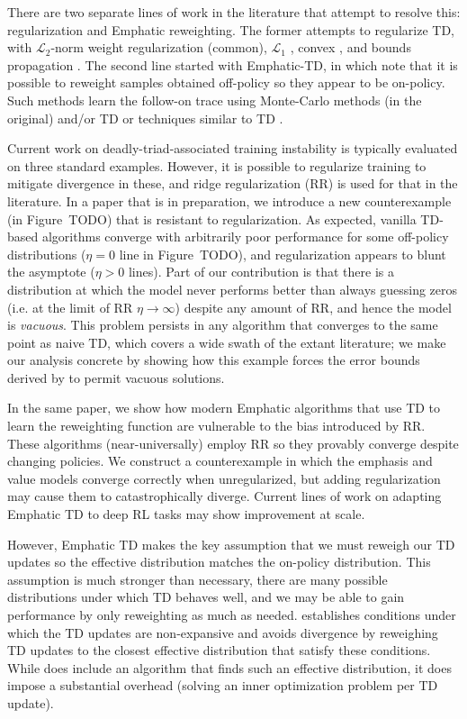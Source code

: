 \documentclass[11pt]{book}
\begin{document}
There are two separate lines of work in the literature that attempt to resolve this: regularization and Emphatic reweighting.
The former attempts to regularize TD, with $\mathcal L_2$-norm weight regularization (common), $\mathcal L_1$ \citep{mahadevan2014proximal}, convex \citep{yu2017convergence}, and bounds propagation \citep{kumar2020discor}.
The second line started with Emphatic-TD, in which \citet{sutton2016emphatic} note that it is possible to reweight samples obtained off-policy so they appear to be on-policy. Such methods learn the follow-on trace using Monte-Carlo methods (in the original) and/or TD \citep{jiang2021learning,zhang2020provably} or techniques similar to TD \citep{hasselt2021expected}.

Current work on deadly-triad-associated training instability is typically evaluated on three standard examples. However, it is possible to regularize training to mitigate divergence in these, and ridge regularization (RR) is used for that in the literature.
In a paper that is in preparation, we introduce a new counterexample (in Figure~TODO) that is resistant to regularization. As expected, vanilla TD-based algorithms converge with arbitrarily poor performance for some off-policy distributions ($\eta=0$ line in Figure~TODO), and regularization appears to blunt the asymptote ($\eta > 0$ lines). Part of our contribution is that there is a distribution at which the model never performs better than always guessing zeros (i.e. at the limit of RR $\eta\to\infty$) despite any amount of RR, and hence the model is \emph{vacuous}. This problem persists in any algorithm that converges to the same point as naive TD, which covers a wide swath of the extant literature; we make our analysis concrete by showing how this example forces the error bounds derived by \citet{zhang2021breaking} to permit vacuous solutions.

In the same paper, we show how modern Emphatic algorithms that use TD to learn the reweighting function are vulnerable to the bias introduced by RR. These algorithms (near-universally) employ RR so they provably converge despite changing policies. We construct a counterexample in which the emphasis and value models converge correctly when unregularized, but adding regularization may cause them to catastrophically diverge. Current lines of work on adapting Emphatic TD to deep RL tasks \cite{jiang2021emphatic,jiang2022learning} may show improvement at scale.

However, Emphatic TD makes the key assumption that we must reweigh our TD updates so the effective distribution matches the on-policy distribution. This assumption is much stronger than necessary, there are many possible distributions under which TD behaves well, and we may be able to gain performance by only reweighting as much as needed. \citet{kolter2011fixed} establishes  conditions under which the TD updates are non-expansive and avoids divergence by reweighing TD updates to the closest effective distribution that satisfy these conditions. While \cite{kolter2011fixed} does include an algorithm that finds such an effective distribution, it does impose a substantial overhead (solving an inner optimization problem per TD update).
\end{document}
